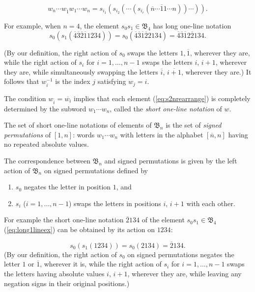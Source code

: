 \documentclass[12pt]{amsart}
\theoremstyle{definition}
\numberwithin{equation}{section}
\newcommand{\bn}{\mathfrak{B}_n}
\newcommand{\mfb}[1]{\mathfrak{B}_{#1}}
\newcommand{\ol}[1]{\overline{#1}}
\begin{document}
\begin{equation}\label{eq:s2nrearrange}
  w_{\ol n} \cdots w_{\ol 1} w_1 \cdots w_n 
= s_{i_1}(s_{i_2}( \cdots (s_{i_r}( \ol n \cdots \ol 1 1 \cdots n)) \cdots )).
\end{equation}

For example, when $n=4$, the element $s_0s_1 \in \mfb4$ has long one-line notation
\begin{equation}\label{eq:long1lineex}
    s_0( s_1(\ol4 \ol3 \ol2 \ol1 1234))
    = s_0(\ol4 \ol3 \ol1 \ol2 2 1 3 4)
    = \ol4 \ol3 \ol1 2 \ol2 1 3 4.
  \end{equation}

(By our definition, the right action of $s_0$ swaps the letters $1, \ol 1$,
wherever they are, while the right action of $s_i$ for $i = 1,\dotsc,n-1$ swaps
the letters $i$, $i+1$, wherever they are, while simultaneously swapping the letters $\ol i$, $\ol{i+1}$,
wherever they are.) It follows that $w_i^{-1}$ is the index $j$ satisfying $w_j = i$.


The condition $w_{\ol i} = \ol{w_i}$
implies that each element (\ref{eq:s2nrearrange}) is completely determined by the subword $w_1 \cdots w_n$, called the \textit{short one-line notation} of $w$.

The set of short one-line notations of elements of $\bn$ is the set of {\em signed permutations} of $[1,n]$:
words $w_1 \cdots w_n$ with letters in the alphabet $[\ol n,n]$ 
having no repeated absolute values.

The correspondence between $\bn$ and signed permutations is given by the left action of $\bn$ on signed permutations defined by
\begin{enumerate}
    \item $s_0$ negates the letter in position $1$, and
    \item $s_i$ ($i = 1,\dotsc,n-1$) swaps the letters in positions $i$, $i+1$ with each other.
\end{enumerate}
For example the short one-line notation $\ol2134$ of the element $s_0s_1 \in \mfb{4}$
(\ref{eq:long1lineex}) can be obtained by its action on $1234$: 

\begin{equation}\label{eq:short1lineex}
   s_0( s_1(1234))
    = s_0(2 1 3 4)
    = 
\ol2 1 3 4.
\end{equation}
(By our definition, the right action of $s_0$ on signed permutations negates the letter $1$ or $\ol1$, wherever it is, while the right action of $s_i$ for $i = 1,\dotsc,n-1$ swaps
the letters having absolute values $i$, $i+1$, wherever they are, while leaving any negation signs in their original positions.)  
\end{document}
